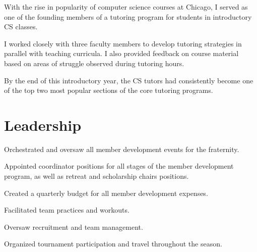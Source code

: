 \documentclass[]{deedy-resume-openfont}
\begin{document}
\begin{minipage}[t]{0.66\textwidth}
\begin{tightemize}
\item With the rise in popularity of computer science courses at Chicago, I served as one of the founding
members of a tutoring program for students in introductory CS classes.
\item I worked closely with three faculty members to develop tutoring strategies in parallel with teaching
curricula. I also provided feedback on course material based on areas of struggle observed during tutoring hours.
\item By the end of this introductory year, the CS tutors had consistently become one of the top two most
popular sections of the core tutoring programs.
\end{tightemize}
\sectionsep


\section{Leadership}
\begin{tightemize}
\item Orchestrated and oversaw all member development events for the fraternity.
\item Appointed coordinator positions for all stages of the member development program, as well as retreat and scholarship chairs positions.
\item Created a quarterly budget for all member development expenses.
\end{tightemize}
\sectionsep

\begin{tightemize}
\item Facilitated team practices and workouts.
\item Oversaw recruitment and team management.
\item Organized tournament participation and travel throughout the season.
\end{tightemize}
\sectionsep


\end{minipage}
\end{document}
